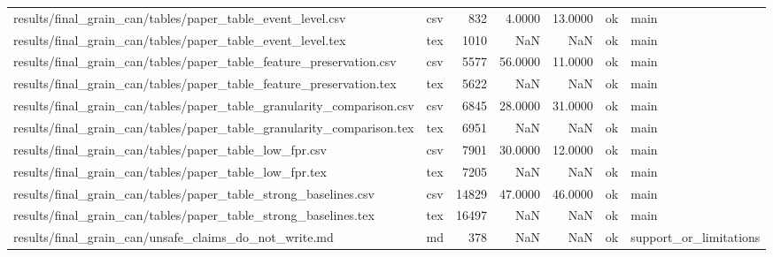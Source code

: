 \begin{tabular}{llrrrll}
results/final_grain_can/tables/paper_table_event_level.csv & csv & 832 & 4.0000 & 13.0000 & ok & main \\
results/final_grain_can/tables/paper_table_event_level.tex & tex & 1010 & NaN & NaN & ok & main \\
results/final_grain_can/tables/paper_table_feature_preservation.csv & csv & 5577 & 56.0000 & 11.0000 & ok & main \\
results/final_grain_can/tables/paper_table_feature_preservation.tex & tex & 5622 & NaN & NaN & ok & main \\
results/final_grain_can/tables/paper_table_granularity_comparison.csv & csv & 6845 & 28.0000 & 31.0000 & ok & main \\
results/final_grain_can/tables/paper_table_granularity_comparison.tex & tex & 6951 & NaN & NaN & ok & main \\
results/final_grain_can/tables/paper_table_low_fpr.csv & csv & 7901 & 30.0000 & 12.0000 & ok & main \\
results/final_grain_can/tables/paper_table_low_fpr.tex & tex & 7205 & NaN & NaN & ok & main \\
results/final_grain_can/tables/paper_table_strong_baselines.csv & csv & 14829 & 47.0000 & 46.0000 & ok & main \\
results/final_grain_can/tables/paper_table_strong_baselines.tex & tex & 16497 & NaN & NaN & ok & main \\
results/final_grain_can/unsafe_claims_do_not_write.md & md & 378 & NaN & NaN & ok & support_or_limitations \\
\bottomrule
\end{tabular}
